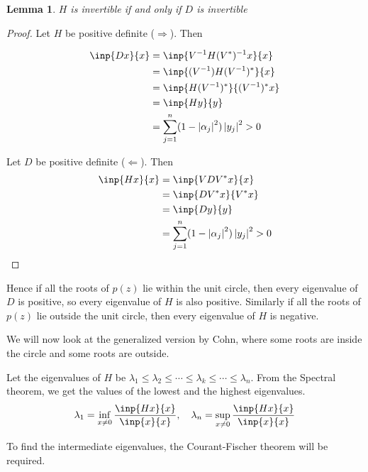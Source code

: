 \documentclass[twofold]{article}
\newcommand*\adj[1]{#1^*}
\newcommand*\abs[1]{\left \vert #1 \right\vert}
\theoremstyle{plain}
\newtheorem*{lemma}{Lemma}
\theoremstyle{definition}
\theoremstyle{remark}
\begin{document}
\begin{lemma} \(H\) is invertible if and only if \(D\) is invertible \end{lemma}
\begin{proof}

Let \(H\) be positive definite (\(\Rightarrow\)). Then

\begin{equation*} \begin{split}
\inp{Dx}{x} & = \inp{V^{-1} H (\adj{V}) ^{-1}x}{x} \\
& = \inp{(V^{-1}) H \adj{(V^{-1})}}{x} \\
& = \inp{ H \adj{(V^{-1})}}{ \adj{(V^{-1})}x}\\
& = \inp{Hy}{y} \\
& = \sum_{j =1}^n (1 - \abs{\alpha_j}^2) \abs{y_j}^2 > 0\\
\end{split} \end{equation*} 


Let \(D\) be positive definite (\(\Leftarrow\)). Then 
\begin{equation*}\begin{split}
\inp{Hx}{x} & = \inp{VD\adj{V} x}{x} \\
& = \inp{D\adj{V} x}{\adj{V}x} \\
& = \inp{Dy}{y} \\
& = \sum_{j =1}^n (1 - \abs{\alpha_j}^2) \abs{y_j}^2 > 0
\end{split} \end{equation*}

\end{proof}

Hence if all the roots of \(p(z)\) lie within the unit circle, then every eigenvalue of \(D\) is positive, so every eigenvalue of \(H\) is also positive. 
Similarly if all the roots of \(p(z)\) lie outside the unit circle, then every eigenvalue of \(H\) is negative. 

We will now look at the generalized version by Cohn, where some roots are inside the circle and some roots are outside.




Let the eigenvalues of \(H\) be \(\lambda_1 \le \lambda_2 \le \cdots \le \lambda_k \le \cdots \le \lambda_n\).
From the Spectral theorem, we get the values of the lowest and the highest eigenvalues. 
\[\lambda_1 = \inf _{x \ne 0} \frac{\inp{Hx}{x}}{\inp{x}{x}}, \quad \lambda_n = \sup_{x \ne 0} \frac{\inp{Hx}{x}}{\inp{x}{x}}\]

To find the intermediate eigenvalues, the Courant-Fischer theorem will be required. 
\end{document}

